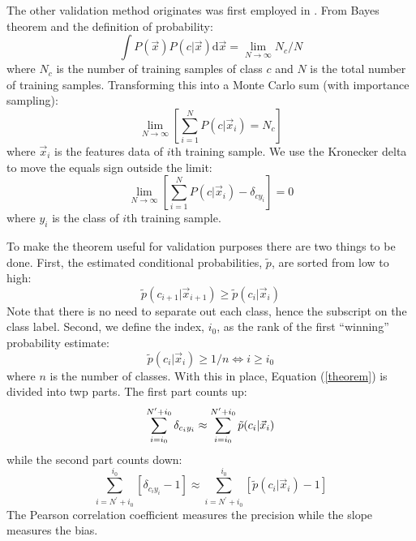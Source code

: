 \documentclass{article}
\begin{document}
The other validation method originates was first employed in \citet{Mills2009}.
From Bayes theorem and the definition of probability:
\begin{equation}
\int P(\vec x) P(c | \vec x) \mathrm d \vec x = \lim_{N \rightarrow \infty} N_c/N
\end{equation}
where $N_c$ is the number of training samples of class $c$ and $N$ is the 
total number of training samples.
Transforming this into a Monte Carlo sum (with importance sampling):
\begin{equation}
	\lim_{N \rightarrow \infty} \left [ \sum_{i=1}^N P(c | \vec x_i) = N_c \right ]
\end{equation}
where $\vec x_i$ is the features data of $i$th training sample.
We use the Kronecker delta 
to move the equals sign outside the limit:
\begin{equation}
	\lim_{N \rightarrow \infty} \left [ \sum_{i=1}^N P(c | \vec x_i) - \delta_{cy_i} \right ] = 0 \label{theorem}
\end{equation}
where $y_i$ is the class of $i$th training sample.

To make the theorem useful for validation purposes there are two things 
to be done.
First, the estimated conditional probabilities, $\tilde p$, are sorted from
low to high:
\begin{equation}
	\tilde p(c_{i+1}|\vec x_{i+1}) \ge \tilde p(c_i|\vec x_i)
\end{equation}
Note that there is no need to separate out each class, hence the subscript
on the class label.
Second, we define the index, $i_0$, as the rank of the first ``winning''
probability estimate:
\begin{equation}
	\tilde p(c_i | \vec x_i) \ge 1/n \iff i \ge i_0
\end{equation}
where $n$ is the number of classes.
With this in place, Equation (\ref{theorem}) is divided into twp parts.
The first part counts up:
\begin{equation}
	\sum_{i=i_0}^{N^\prime+i_0} \delta_{c_iy_i} 
		\approx \sum_{i=i_0}^{N^\prime+i_0} \tilde p(c_i | \vec x_i) \\
\end{equation}
while the second part counts down:
\begin{equation}
	\sum_{i=N^\prime+i_0}^{i_0} \left [\delta_{c_iy_i}-1 \right ] 
	\approx \sum_{i=N^\prime+i_0}^{i_0} \left [\tilde p(c_i | \vec x_i) - 1 \right ]
	\label{second_part}
\end{equation}
The Pearson correlation coefficient measures the precision while the slope
measures the bias.
\end{document}
